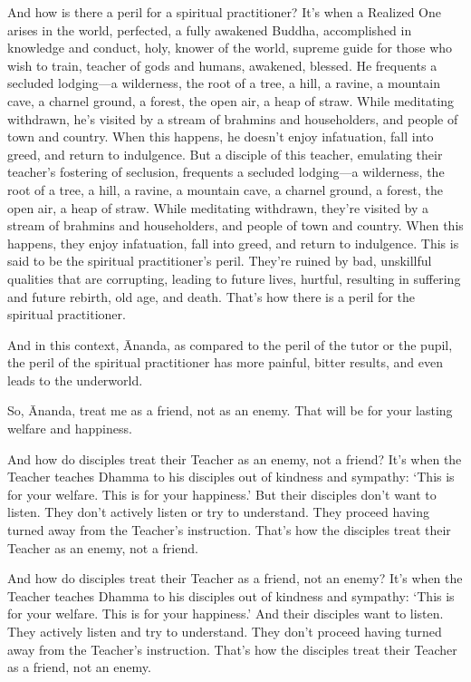 \documentclass[12pt,openany]{book}%
\begin{document}
And how is there a peril for a spiritual practitioner? It’s when a Realized One arises in the world, perfected, a fully awakened Buddha, accomplished in knowledge and conduct, holy, knower of the world, supreme guide for those who wish to train, teacher of gods and humans, awakened, blessed. He frequents a secluded lodging—a wilderness, the root of a tree, a hill, a ravine, a mountain cave, a charnel ground, a forest, the open air, a heap of straw. While meditating withdrawn, he’s visited by a stream of brahmins and householders, and people of town and country. When this happens, he doesn’t enjoy infatuation, fall into greed, and return to indulgence. But a disciple of this teacher, emulating their teacher’s fostering of seclusion, frequents a secluded lodging—a wilderness, the root of a tree, a hill, a ravine, a mountain cave, a charnel ground, a forest, the open air, a heap of straw. While meditating withdrawn, they’re visited by a stream of brahmins and householders, and people of town and country. When this happens, they enjoy infatuation, fall into greed, and return to indulgence. This is said to be the spiritual practitioner’s peril. They’re ruined by bad, unskillful qualities that are corrupting, leading to future lives, hurtful, resulting in suffering and future rebirth, old age, and death. That’s how there is a peril for the spiritual practitioner. 

And in this context, Ānanda, as compared to the peril of the tutor or the pupil, the peril of the spiritual practitioner has more painful, bitter results, and even leads to the underworld. 

So, Ānanda, treat me as a friend, not as an enemy. That will be for your lasting welfare and happiness. 

And how do disciples treat their Teacher as an enemy, not a friend? It’s when the Teacher teaches Dhamma to his disciples out of kindness and sympathy: ‘This is for your welfare. This is for your happiness.’ But their disciples don’t want to listen. They don’t actively listen or try to understand. They proceed having turned away from the Teacher’s instruction. That’s how the disciples treat their Teacher as an enemy, not a friend. 

And how do disciples treat their Teacher as a friend, not an enemy? It’s when the Teacher teaches Dhamma to his disciples out of kindness and sympathy: ‘This is for your welfare. This is for your happiness.’ And their disciples want to listen. They actively listen and try to understand. They don’t proceed having turned away from the Teacher’s instruction. That’s how the disciples treat their Teacher as a friend, not an enemy. 
\end{document}
